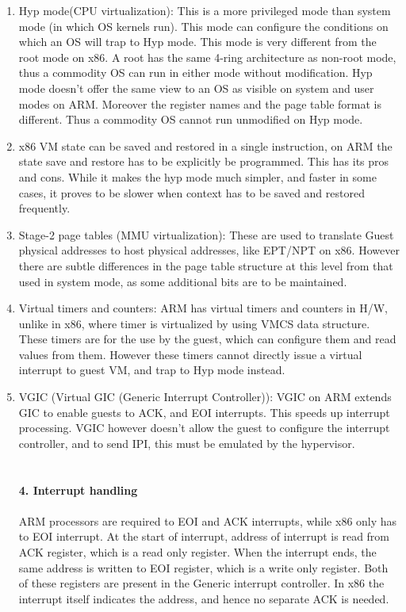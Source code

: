 \documentclass[a4paper,10pt]{article}
\begin{document}
\begin{enumerate}
\item Hyp mode(CPU virtualization): This is a more privileged mode than system mode (in which OS kernels run). This mode can configure the conditions on which an OS will trap to Hyp mode. This mode is very different from the root mode on x86. A root has the same 4-ring architecture as non-root mode, thus a commodity OS can run in either mode without modification. Hyp mode doesn't offer the same view to an OS as visible on system and user modes on ARM. Moreover the register names and the page table format is different. Thus a commodity OS cannot run unmodified on Hyp mode.

\item x86 VM state can be saved and restored in a single instruction, on ARM the state save and restore has to be explicitly be programmed. This has its pros and cons. While it makes the hyp mode much simpler, and faster in some cases, it proves to be slower when context has to be saved and restored frequently.

\item Stage-2 page tables (MMU virtualization): These are used to translate Guest physical addresses to host physical addresses, like EPT/NPT on x86. However there are subtle differences in the page table structure at this level from that used in system mode, as some additional bits are to be maintained.

\item Virtual timers and counters: ARM has virtual timers and counters in H/W, unlike in x86, where timer is virtualized by using VMCS data structure. These timers are for the use by the guest, which can configure them and read values from them. However these timers cannot directly issue a virtual interrupt to guest VM, and trap to Hyp mode instead.

\item VGIC (Virtual GIC (Generic Interrupt Controller)): VGIC on ARM extends GIC to enable guests to ACK, and EOI interrupts. This speeds up interrupt processing. VGIC however doesn't allow the guest to configure the interrupt controller, and to send IPI, this must be emulated by the hypervisor.
\\\\\\

\textbf{4. Interrupt handling}
\\\\
ARM processors are required to EOI and ACK interrupts, while x86 only has to EOI interrupt. At the start of interrupt, address of interrupt is read from ACK register, which is a read only register. When the interrupt ends, the same address is written to EOI register, which is a write only register. Both of these registers are present in the Generic interrupt controller. In x86 the interrupt itself indicates the address, and hence no separate ACK is needed.
\end{enumerate}
\end{document}
